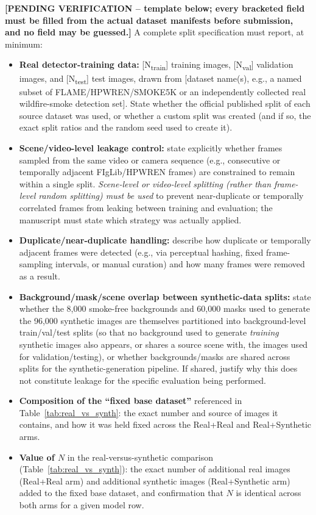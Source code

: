 \documentclass[journal]{IEEEtran}
\begin{document}
\textbf{[PENDING VERIFICATION -- template below; every bracketed field must
be filled from the actual dataset manifests before submission, and no field
may be guessed.]} A complete split specification must report, at minimum:

\begin{itemize}
    \item \textbf{Real detector-training data:} [N\textsubscript{train}]
    training images, [N\textsubscript{val}] validation images, and
    [N\textsubscript{test}] test images, drawn from [dataset name(s), e.g.,
    a named subset of FLAME/HPWREN/SMOKE5K or an independently collected
    real wildfire-smoke detection set]. State whether the official
    published split of each source dataset was used, or whether a custom
    split was created (and if so, the exact split ratios and the random
    seed used to create it).
    \item \textbf{Scene/video-level leakage control:} state explicitly
    whether frames sampled from the same video or camera sequence (e.g.,
    consecutive or temporally adjacent FIgLib/HPWREN frames) are
    constrained to remain within a single split. \emph{Scene-level or
    video-level splitting (rather than frame-level random splitting) must
    be used} to prevent near-duplicate or temporally correlated frames
    from leaking between training and evaluation; the manuscript must
    state which strategy was actually applied.
    \item \textbf{Duplicate/near-duplicate handling:} describe how
    duplicate or temporally adjacent frames were detected (e.g., via
    perceptual hashing, fixed frame-sampling intervals, or manual curation)
    and how many frames were removed as a result.
    \item \textbf{Background/mask/scene overlap between synthetic-data
    splits:} state whether the 8,000 smoke-free backgrounds and 60,000
    masks used to generate the 96,000 synthetic images are themselves
    partitioned into background-level train/val/test splits (so that no
    background used to generate \emph{training} synthetic images also
    appears, or shares a source scene with, the images used for
    validation/testing), or whether backgrounds/masks are shared across
    splits for the synthetic-generation pipeline. If shared, justify why
    this does not constitute leakage for the specific evaluation being
    performed.
    \item \textbf{Composition of the ``fixed base dataset''} referenced in
    Table~\ref{tab:real_vs_synth}: the exact number and source of images it
    contains, and how it was held fixed across the Real+Real and
    Real+Synthetic arms.
    \item \textbf{Value of $N$} in the real-versus-synthetic comparison
    (Table~\ref{tab:real_vs_synth}): the exact number of additional real
    images (Real+Real arm) and additional synthetic images
    (Real+Synthetic arm) added to the fixed base dataset, and confirmation
    that $N$ is identical across both arms for a given model row.
\end{itemize}
\end{document}
